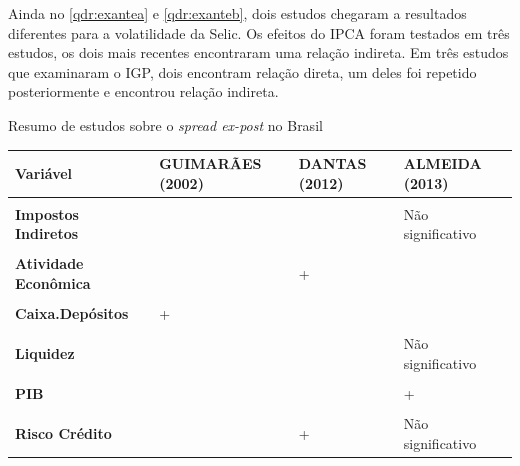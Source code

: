 \documentclass[
  12pt,
  12pt,
  openright,
  oneside,
  a4paper,
  chapter=TITLE,
  section=TITLE,
  subsection=TITLE,
  subsubsection=TITLE,
  english,
  portugues,
  sumario=tradicional]{abntex2}
\begin{document}
Ainda no \autoref{qdr:exantea} e \autoref{qdr:exanteb}, dois estudos chegaram a resultados diferentes para a volatilidade da Selic. Os efeitos do IPCA foram testados em três estudos, os dois mais recentes encontraram uma relação indireta. Em três estudos que examinaram o IGP, dois encontram relação direta, um deles foi repetido posteriormente e encontrou relação indireta.

\begin{qdr}
\vspace{20pt}
\caption{Resumo de estudos sobre o \emph{spread ex-post} no Brasil}
\vspace{1mm}
\begingroup\fontsize{10}{12}\selectfont

\begin{tabu} to 
\toprule
Variável & GUIMARÃES (2002) & DANTAS (2012) & ALMEIDA (2013)\\
\midrule
\textbf{} &  &  & \\
\textbf{Impostos Indiretos} &  &  & Não significativo\\
\textbf{} &  &  & \\
\textbf{Atividade Econômica} &  & + & \\
\textbf{} &  &  & \\
\addlinespace
\textbf{Caixa.Depósitos} & + &  & \\
\textbf{} &  &  & \\
\textbf{Liquidez} &  &  & Não significativo\\
\textbf{} &  &  & \\
\textbf{PIB} &  &  & +\\
\addlinespace
\textbf{} &  &  & \\
\textbf{Risco Crédito} &  & + & Não significativo\\
\bottomrule
\end{tabu}
\endgroup{}
\vspace{1mm}
\label{qdr:expost}
\vspace{-2mm}
\end{qdr}
\end{document}
